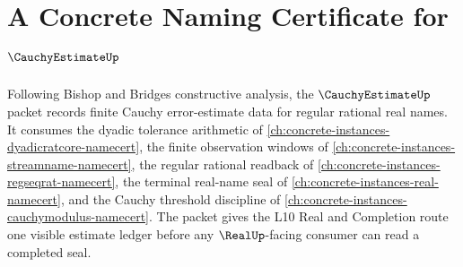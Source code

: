 \chapter{A Concrete Naming Certificate for $\CauchyEstimateUp$}
\label{ch:concrete-instances-cauchy-estimate-namecert}

Following Bishop and Bridges constructive analysis, the $\CauchyEstimateUp$ packet records finite Cauchy error-estimate data for regular rational real names. It consumes the dyadic tolerance arithmetic of \autoref{ch:concrete-instances-dyadicratcore-namecert}, the finite observation windows of \autoref{ch:concrete-instances-streamname-namecert}, the regular rational readback of \autoref{ch:concrete-instances-regseqrat-namecert}, the terminal real-name seal of \autoref{ch:concrete-instances-real-namecert}, and the Cauchy threshold discipline of \autoref{ch:concrete-instances-cauchymodulus-namecert}. The packet gives the L10 Real and Completion route one visible estimate ledger before any $\RealUp$-facing consumer can read a completed seal.

